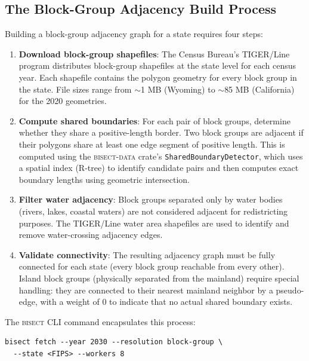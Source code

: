 \label{sec:construction}

\subsection{The Block-Group Adjacency Build Process}

Building a block-group adjacency graph for a state requires four steps:

\begin{enumerate}
\item \textbf{Download block-group shapefiles}: The Census Bureau's TIGER/Line program
  distributes block-group shapefiles at the state level for each census year. Each shapefile
  contains the polygon geometry for every block group in the state. File sizes range
  from $\sim$1 MB (Wyoming) to $\sim$85 MB (California) for the 2020 geometries.

\item \textbf{Compute shared boundaries}: For each pair of block groups, determine whether
  they share a positive-length border. Two block groups are adjacent if their polygons
  share at least one edge segment of positive length. This is computed using the
  \textsc{bisect-data} crate's \texttt{SharedBoundaryDetector}, which uses a spatial
  index (R-tree) to identify candidate pairs and then computes exact boundary lengths
  using geometric intersection.

\item \textbf{Filter water adjacency}: Block groups separated only by water bodies
  (rivers, lakes, coastal waters) are not considered adjacent for redistricting purposes.
  The TIGER/Line water area shapefiles are used to identify and remove water-crossing
  adjacency edges.

\item \textbf{Validate connectivity}: The resulting adjacency graph must be fully connected
  for each state (every block group reachable from every other). Island block groups
  (physically separated from the mainland) require special handling: they are connected
  to their nearest mainland neighbor by a pseudo-edge, with a weight of 0 to indicate
  that no actual shared boundary exists.
\end{enumerate}

The \textsc{bisect} CLI command encapsulates this process:

\begin{verbatim}
bisect fetch --year 2030 --resolution block-group \
  --state <FIPS> --workers 8
\end{verbatim}

